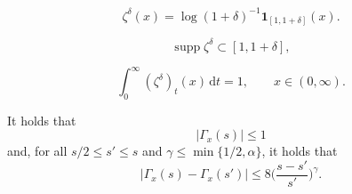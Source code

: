 \documentclass[10pt,a4paper]{amsart}
\DeclareMathOperator{\supp}{\operatorname{supp}}
\begin{document}
\begin{equation}\label{e:zeta}
    \zeta^\delta(x) = \log(1 + \delta)^{-1} \mathbf{1}_{[1,1 + \delta]}(x). 
\end{equation}

\begin{equation}
    \supp \zeta^{\delta} \subset [1, 1+\delta], \label{e:zeta_supp}
\end{equation}

\begin{equation}
    \int_0^\infty (\zeta^{\delta})_t(x) \, \mathrm{d}t = 1, \qquad x \in (0,\infty).\label{e:zeta_int}
\end{equation}

    \begin{lemma}
        \label{l:gamma}
        It holds that
        \begin{equation}
            \label{e:g_upper}
            |\Gamma_x(s)| \le 1
        \end{equation}
        and, for all $s/2 \le s' \le s$ and $\gamma \le \min\{1/2, \alpha\}$, it holds that
        \begin{equation}
            \label{e:g_hol}
            |\Gamma_x(s) - \Gamma_x(s')| \le 8 \Big(\frac{s - s'}{s'}\Big)^\gamma.
        \end{equation}
    \end{lemma}
\end{document}
